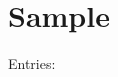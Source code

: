 \documentclass{article}
\begin{document}
\tableofcontents

\section{Sample}

Entries: 

\printglossaries
\end{document}
